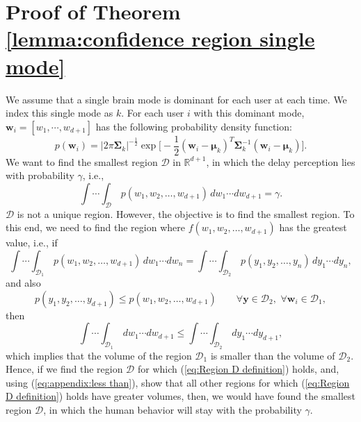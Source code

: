 \documentclass[journal,draftclsnofoot,onecolumn,12pt]{IEEEtran}%
\newcommand{\mub}{\boldsymbol{\mu}}
\newcommand{\Sigmab}{\boldsymbol{\Sigma}}
\newcommand{\Db}{\mathcal{D}}
\newcommand{\wb}{\boldsymbol{w}}
\begin{document}
	
	
	\appendices
	
	\section{Proof of Theorem \ref{lemma:confidence region single mode}}
	We assume that a single brain mode is dominant for each user at each time. We index this single mode as $k$. For each user $i$ with this dominant mode, {$\wb_i=[w_1,\cdots,w_{d+1}]$} has the following probability density function:
	{\begin{equation}
	p(\wb_i)=	|2\pi \Sigmab_k|^{-\frac{1}{2}} \exp\Big[-\frac{1}{2}(\wb_i-\mub_k)^T\Sigmab_k^{-1}(\wb_i-\mub_k)\Big].
	\end{equation}  }
	We want to find the smallest region $\mathcal{D}$ in $\mathds{R}^{d+1}$, in which the delay perception lies  with probability $\gamma$, i.e., 
	{\begin{equation}
	\label{eq:Region D definition}
	\int \cdots \int_\mathcal{D}\, p(w_1,w_2,\ldots,w_{d+1}) \,dw_1 \!\cdots dw_{d+1}=\gamma.
	\end{equation} }
	$\Db$ is not a unique region. However, the objective is to find the smallest region.
	To this end, we need to find the region where {$f(w_1,w_2,\ldots,w_{d+1})$} has the greatest value, i.e., if
	{\begin{equation}
	\label{eq:appendix:equal to}
	\int \cdots \int_{\Db_1}\, p(w_1,w_2,\ldots,w_{d+1}) \,dw_1 \!\cdots dw_n=\int \cdots \int_{\Db_2}\, p(y_1,y_2,\ldots,y_n) \,dy_1 \!\cdots dy_n,
	\end{equation} }
	and also{
	\begin{equation}
	\label{eq:appendix:less than}
	p(y_1,y_2,\ldots,y_{d+1}) \leq p(w_1,w_2,\ldots,w_{d+1}) \qquad\forall \boldsymbol{y} \in \Db_2,\,\, \forall \wb_i \in \Db_1,
	\end{equation}}
	then 
	{\begin{equation}
	\int \cdots \int_{\Db_1} \,dw_1 \!\cdots dw_{d+1} \leq \int \cdots \int_{\Db_2} \,dy_1 \!\cdots dy_{d+1},
	\end{equation}}
	which implies that the volume of the region $\Db_1$ is smaller than the volume of $\Db_2$. Hence, if we find the region $\Db$ for which (\ref{eq:Region D definition}) holds, and, using (\ref{eq:appendix:less than}), show that all other regions for which (\ref{eq:Region D definition}) holds have greater volumes, then, we would have found the smallest region $\Db$, in which the human behavior will stay with the probability $\gamma$.   
	
\end{document}

